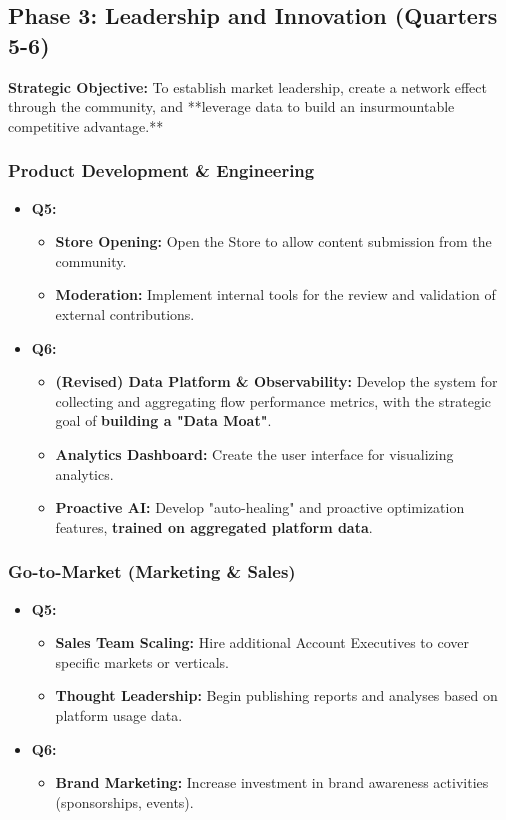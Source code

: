 \documentclass[11pt, a4paper, oneside]{article}
\begin{document}
\clearpage

\subsection{Phase 3: Leadership and Innovation (Quarters 5-6)}
\textbf{Strategic Objective:} To establish market leadership, create a network effect through the community, and **leverage data to build an insurmountable competitive advantage.**

\subsubsection*{Product Development \& Engineering}
\begin{itemize}[leftmargin=*]
    \item \textbf{Q5:}
    \begin{itemize}
        \item \textbf{Store Opening:} Open the Store to allow content submission from the community.
        \item \textbf{Moderation:} Implement internal tools for the review and validation of external contributions.
    \end{itemize}
    \item \textbf{Q6:}
    \begin{itemize}
        \item \textbf{(Revised) Data Platform \& Observability:} Develop the system for collecting and aggregating flow performance metrics, with the strategic goal of \textbf{building a "Data Moat"}.
        \item \textbf{Analytics Dashboard:} Create the user interface for visualizing analytics.
        \item \textbf{Proactive AI:} Develop "auto-healing" and proactive optimization features, \textbf{trained on aggregated platform data}.
    \end{itemize}
\end{itemize}

\subsubsection*{Go-to-Market (Marketing \& Sales)}
\begin{itemize}[leftmargin=*]
    \item \textbf{Q5:}
    \begin{itemize}
        \item \textbf{Sales Team Scaling:} Hire additional Account Executives to cover specific markets or verticals.
        \item \textbf{Thought Leadership:} Begin publishing reports and analyses based on platform usage data.
    \end{itemize}
    \item \textbf{Q6:}
    \begin{itemize}
        \item \textbf{Brand Marketing:} Increase investment in brand awareness activities (sponsorships, events).
    \end{itemize}
\end{itemize}
\end{document}
